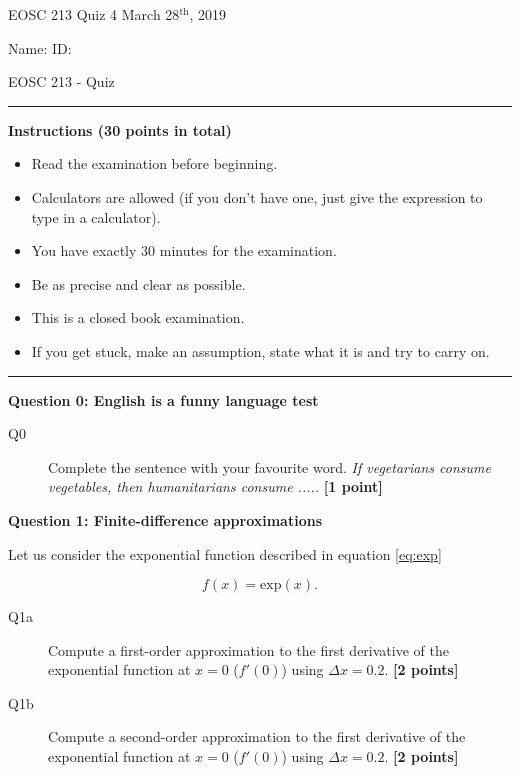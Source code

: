 \documentclass{article}
\begin{document}
\pagestyle{first}


\large{EOSC 213 Quiz 4} \hspace{10cm} \large{March 28$^{\textrm{th}}$, 2019}

\large{Name:} \hspace{12cm} \large{ID: }
\begin{center}
\Huge{EOSC 213 - Quiz}
\end{center}

\rule{\textwidth}{1pt}

\large{\textbf{Instructions (30 points in total)}}
\begin{multicols}{2}
\begin{itemize}
\item Read the examination before beginning.
\item Calculators are allowed (if you don't have one, just give the expression to type in a calculator).
\item You have exactly 30 minutes for the examination.
\item Be as precise and clear as possible.
\item This is a closed book examination.
\item If you get stuck, make an assumption, state what it is and try to carry on.
\end{itemize} 
\end{multicols}



\rule{\textwidth}{1pt}

\textbf{Question 0: English is a funny language test}

\begin{description}
\item [Q0] Complete the sentence with your favourite word. \textit{If vegetarians consume vegetables, then humanitarians consume .....}  \textbf{[1 point]}
\vspace{0.5cm}

\end{description}

\textbf{Question 1: Finite-difference approximations}

Let us consider the exponential function described in equation \ref{eq:exp}

\begin{equation}
f(x) = \mathrm{exp}(x). \label{eq:exp}
\end{equation} 


\begin{description}
\item [Q1a] Compute a first-order approximation to the first derivative of the exponential function at $x = 0$ ($f'(0)$) using $\Delta x  = 0.2$.  \textbf{[2 points]}
\vspace{3cm}
\item [Q1b] Compute a second-order approximation to the first derivative of the exponential function at $x = 0$ ($f'(0)$) using $\Delta x  = 0.2$.  \textbf{[2 points]}
\vspace{3.5cm}

\end{description}
\end{document}
